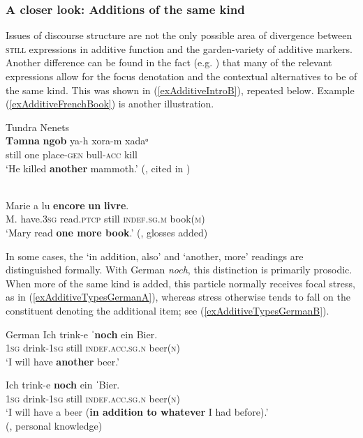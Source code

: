 \subsubsection{A closer look: Additions of the same kind} Issues of discourse structure are not the only possible area of divergence between \textsc{still} expressions in additive function and the garden-variety of additive markers. Another difference can be found in the fact (e.g. \cite[146]{Koenig1991}) that many of the relevant expressions allow for the focus denotation and the contextual alternatives to be of the same kind. This was shown in (\ref{exAdditiveIntroB}), repeated below. Example (\ref{exAdditiveFrenchBook}) is another illustration.

\begin{exe}[(22b)]
		 Tundra Nenets\\
		\gll \textbf{Təmna} \textbf{ngob} ya-h xora-m xadaᵒ\\
		still one place-\textsc{gen}	 bull-\textsc{acc} kill\\
		\glt \lq He killed \textbf{another} mammoth.' (\cite[18]{Labanauskas1995}, cited in \cite[186]{Nikolaeva2014})
		
		\ex {}\label{exAdditiveFrenchBook}\\
		\gll Marie a lu \textbf{encore} \textbf{un} \textbf{livre}.\\
	M. have.3\textsc{sg} read.\textsc{ptcp} still \textsc{indef}.\textsc{sg}.\textsc{m} book(\textsc{m})\\
	\glt \lq Mary read \textbf{one more book}.' (\cite[9]{TovenaDonazzan2008}, glosses added)
\end{exe}

In some cases, the \lq in addition, also\rq{ }and \lq another, more\rq{ }readings are distinguished formally. With German \textit{noch}, this distinction is primarily prosodic. When more of the same kind is added, this particle normally receives focal stress, as in (\ref{exAdditiveTypesGermanA}), whereas stress otherwise tends to fall on the constituent denoting the additional item; see (\ref{exAdditiveTypesGermanB}).

\begin{exe}
	\ex 
	\begin{xlist}
		\exi{}German
		\ex\label{exAdditiveTypesGermanA}
		\gll Ich trink-e \textbf{ˈnoch} ein Bier.\\
	1\textsc{sg} drink-1\textsc{sg} \phantom{ˈ}still \textsc{indef}.\textsc{acc}.\textsc{sg}.\textsc{n} beer(\textsc{n})\\
	\glt \lq I will have \textbf{another} beer.' 

	\ex\label{exAdditiveTypesGermanB}
	\gll Ich trink-e \textbf{noch} ein ˈBier.\\
	1\textsc{sg} drink-1\textsc{sg} still \textsc{indef}.\textsc{acc}.\textsc{sg}.\textsc{n} \phantom{ˈ}beer(\textsc{n})\\
	\glt \lq I will have a beer (\textbf{in addition to whatever} I had before).\rq{}
	\\(\cite[143]{Koenig1991}, personal knowledge)
	\end{xlist}
\end{exe}

